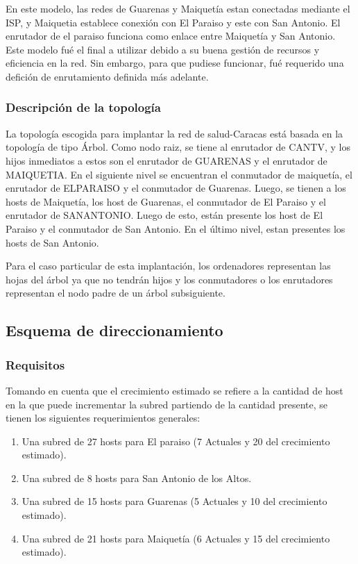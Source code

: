 En este modelo, las redes de Guarenas y Maiquetía estan conectadas
mediante el ISP, y Maiquetia establece conexión con El Paraiso y este
con San Antonio. El enrutador de el paraiso funciona como enlace entre
Maiquetía y San Antonio. Este modelo fué el final a utilizar debido a su
buena gestión de recursos y eficiencia en la red. Sin embargo, para que
pudiese funcionar, fué requerido una defición de enrutamiento definida
más adelante.

\subsubsection{Descripción de la
topología}\label{descripciuxf3n-de-la-topologuxeda}

La topología escogida para implantar la red de salud-Caracas está basada
en la topología de tipo Árbol. Como nodo raiz, se tiene al enrutador de
CANTV, y los hijos inmediatos a estos son el enrutador de GUARENAS y el
enrutador de MAIQUETIA. En el siguiente nivel se encuentran el
conmutador de maiquetía, el enrutador de ELPARAISO y el conmutador de
Guarenas. Luego, se tienen a los hosts de Maiquetía, los host de
Guarenas, el conmutador de El Paraiso y el enrutador de SANANTONIO.
Luego de esto, están presente los host de El Paraiso y el conmutador de
San Antonio. En el último nivel, estan presentes los hosts de San
Antonio.

Para el caso particular de esta implantación, los ordenadores
representan las hojas del árbol ya que no tendrán hijos y los
conmutadores o los enrutadores representan el nodo padre de un árbol
subsiguiente.

\subsection{Esquema de
direccionamiento}\label{esquema-de-direccionamiento}

\subsubsection{Requisitos}\label{requisitos}

Tomando en cuenta que el crecimiento estimado se refiere a la cantidad
de host en la que puede incrementar la subred partiendo de la cantidad
presente, se tienen los siguientes requerimientos generales:

\begin{enumerate}
\def\labelenumi{\arabic{enumi}.}
\itemsep1pt\parskip0pt
\item
  Una subred de 27 hosts para El paraiso (7 Actuales y 20 del
  crecimiento estimado).
\item
  Una subred de 8 hosts para San Antonio de los Altos.
\item
  Una subred de 15 hosts para Guarenas (5 Actuales y 10 del crecimiento
  estimado).
\item
  Una subred de 21 hosts para Maiquetía (6 Actuales y 15 del crecimiento
  estimado).
\end{enumerate}

